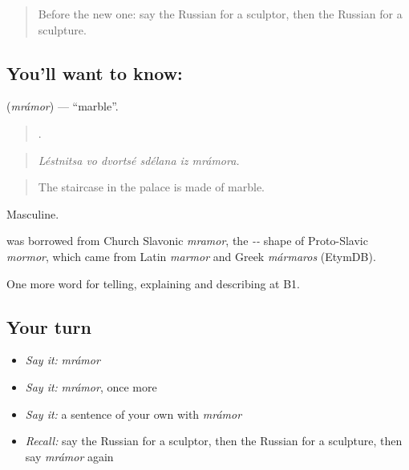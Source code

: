 \begin{quote}
Before the new one: say the Russian for a sculptor, then the Russian for a sculpture.
\end{quote}

\subsection*{You'll want to know: }
\textbf{} (\emph{mrámor}) — \textquotedblleft{}marble\textquotedblright{}.

\begin{quote}
     .
\end{quote}

\begin{quote}
\emph{Léstnitsa vo dvortsé sdélana iz mrámora.}
\end{quote}

\begin{quote}
The staircase in the palace is made of marble.
\end{quote}

Masculine.

\begin{cousinweb}
\emph{} was borrowed from Church Slavonic \emph{mramor}, the \emph{--} shape of Proto-Slavic \emph{mormor}, which came from Latin \emph{marmor} and Greek \emph{mármaros} (EtymDB).
\end{cousinweb}

\begin{grammarlens}[title={What you've built}]
One more word for telling, explaining and describing at B1.
\end{grammarlens}

\subsection*{Your turn}
\begin{itemize}
\raggedright
  \item \emph{Say it:} \emph{mrámor}
  \item \emph{Say it:} \emph{mrámor}, once more
  \item \emph{Say it:} a sentence of your own with \emph{mrámor}
  \item \emph{Recall:} say the Russian for a sculptor, then the Russian for a sculpture, then say \emph{mrámor} again
\end{itemize}

